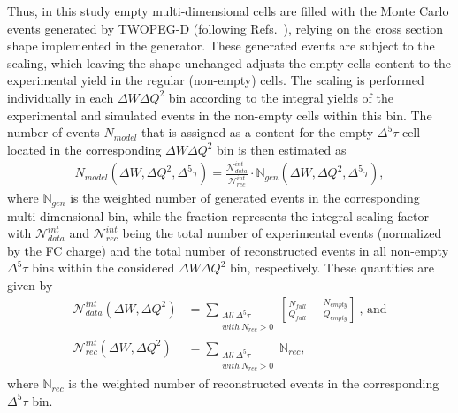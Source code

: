 Thus, in this study empty multi-dimensional cells are filled with the Monte Carlo events generated by TWOPEG-D (following Refs.~\cite{Rip_an_note:2002,Ripani:2002ss,Fed_an_note:2007,Fedotov:2008aa,Isupov:2017lnd,Arjun}), relying on the cross section shape implemented in the generator. These generated events are subject to the scaling, which leaving the shape unchanged adjusts the empty cells content to the experimental yield in the regular (non-empty) cells. The scaling is performed individually in each $\Delta W\Delta Q^2$ bin according to the integral yields of the experimental and simulated events in the non-empty cells within this bin. The number of events $N_{model}$ that is assigned as a content for the empty $\Delta^{5}\tau$ cell located in the corresponding $\Delta W\Delta Q^2$ bin is then estimated as
\begin{equation}
\begin{aligned}
N_{model}(\Delta W,\Delta Q^2,\Delta^{5}\tau) = \frac{\mathcal{N}_{data}^{int}}{\mathcal{N}_{rec}^{int}} \! \cdot \!\mathbb{N}_{gen}(\Delta W,\Delta Q^2,\Delta^{5}\tau),
\end{aligned}\label{n_model}
\end{equation}
where $\mathbb{N}_{gen}$ is the weighted number of generated events in the corresponding multi-dimensional bin, while the fraction represents the integral scaling factor with $\mathcal{N}_{data}^{int}$ and $\mathcal{N}_{rec}^{int}$ being the total number of experimental events (normalized by the FC charge) and the total number of reconstructed events in all non-empty $\Delta^{5}\tau$ bins within the considered $\Delta W\Delta Q^2$ bin, respectively. These quantities are given by
\begin{equation}
\begin{aligned}
\mathcal{N}_{data}^{int}(\Delta W,\Delta Q^2) &= \sum_{\substack{All~\Delta^{5}\tau\\ with~N_{rec}>0}} \!\!\! \left [\frac{N_{full}}{Q_{full}}-\frac{N_{empty}}{Q_{empty}} \right ]~\textrm{,~and}\\[8pt]
\mathcal{N}_{rec}^{int}(\Delta W,\Delta Q^2)  &= \sum_{\substack{All~\Delta^{5}\tau\\ with~N_{rec}>0}} \!\!\!\!\!\! \mathbb{N}_{rec},
\end{aligned}\label{ints}
\end{equation}
where  $\mathbb{N}_{rec}$ is the weighted number of reconstructed events in the corresponding $\Delta^{5}\tau$ bin. 

